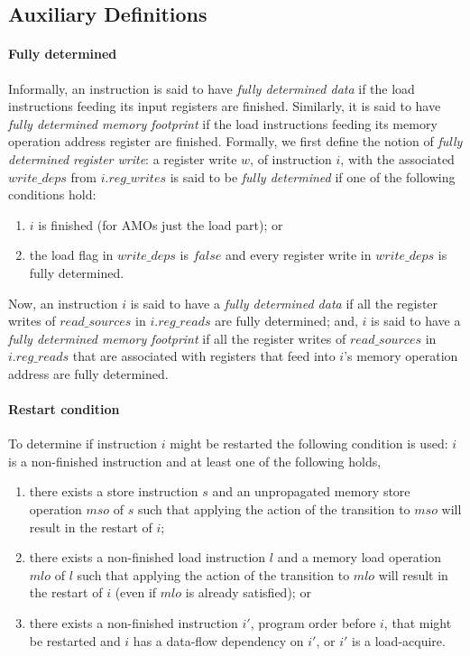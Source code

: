 \subsection{Auxiliary Definitions}\label{sec:omm:aux}
\paragraph{Fully determined}
Informally, an instruction is said to have {\it fully determined data} if the load instructions feeding its input registers are finished.
Similarly, it is said to have {\it fully determined memory footprint} if the load instructions feeding its memory operation address register are finished.
%
Formally, we first define the notion of {\it fully determined register write}: a register write $w$, of instruction $i$, with the associated $write\_deps$ from $i.reg\_writes$ is said to be {\it fully determined} if one of the following conditions hold:
\begin{enumerate}
\item $i$ is finished (for AMOs just the load part); or
\item the load flag in $write\_deps$ is $false$ and every register write in $write\_deps$ is fully determined.
\end{enumerate}
Now, an instruction $i$ is said to have a {\it fully determined data} if all the register writes of $read\_sources$ in $i.reg\_reads$ are fully determined;
and, $i$ is said to have a {\it fully determined memory footprint} if all the register writes of $read\_sources$ in $i.reg\_reads$ that are associated with registers that feed into $i$'s memory operation address are fully determined.


\paragraph{Restart condition}\label{omm:restart_condition}
To determine if instruction $i$ might be restarted the following condition is used: $i$ is a non-finished instruction and at least one of the following holds,
\begin{enumerate}
\item there exists a store instruction $s$ and an unpropagated memory store operation $mso$ of $s$ such that applying the action of the  transition to $mso$ will result in the restart of $i$;
\item there exists a non-finished load instruction $l$ and a memory load operation $mlo$ of $l$ such that applying the action of the  transition to $mlo$ will result in the restart of $i$ (even if $mlo$ is already satisfied); or
\item there exists a non-finished instruction $i'$, program order before $i$, that might be restarted and $i$ has a data-flow dependency on $i'$, or $i'$ is a load-acquire.
\end{enumerate}
